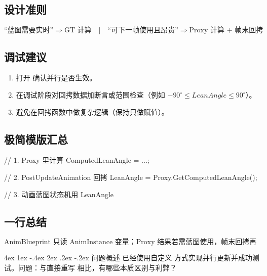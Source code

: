 \documentclass[10pt,openright,oneside,CJKmath]{MyBook}
\makeatletter
\renewcommand{\section}{\@startsection{section}{1}{\z@}%
{4ex \@plus 1ex \@minus -.4ex}%
{2ex \@plus.2ex \@minus -.2ex}%
{\color{black}\rmfamily\large\sffamily\bfseries}}
\makeatother
\begin{document}
\subsection{设计准则}
\[
\text{“蓝图需要实时”} \Rightarrow \text{GT 计算} \quad|\quad
\text{“可下一帧使用且昂贵”} \Rightarrow \text{Proxy 计算 + 帧末回拷}
\]

\subsection{调试建议}
\begin{enumerate}
  \item 打开  确认并行是否生效。
  \item 在调试阶段对回拷数据加断言或范围检查（例如 \(-90^\circ \le LeanAngle \le 90^\circ\)）。
  \item 避免在回拷函数中做复杂逻辑（保持只做赋值）。
\end{enumerate}

\subsection{极简模版汇总}
\begin{code}
// 1. Proxy 里计算
ComputedLeanAngle = ...;

// 2. PostUpdateAnimation 回拷
LeanAngle = Proxy.GetComputedLeanAngle();

// 3. 动画蓝图状态机用 LeanAngle
\end{code}

\subsection{一行总结}
\[
\boxed{\text{AnimBlueprint 只读 AnimInstance 变量；Proxy 结果若需蓝图使用，帧末回拷再生效。}}
\]

\section{问题概述}
已经使用自定义  方式实现并行更新并成功测试。问题：与直接重写  相比，有哪些本质区别与利弊？
\end{document}
